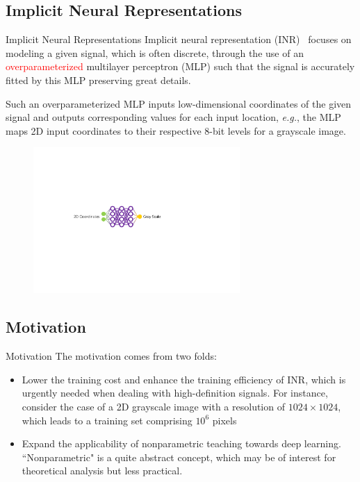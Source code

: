 \documentclass[aspectratio=169,xcolor=dvipsnames]{beamer}
\newcommand{\eg}{\textit{\fontspec{Times New Roman}e.g.}}
\begin{document}
\subsection{Implicit Neural Representations}
\begin{frame}{Implicit Neural Representations}
\justify
\vspace{-2mm}
Implicit neural representation (INR)~\cite{sitzmann2020implicit,tancik2020fourier} focuses on modeling a given signal, which is often discrete, through the use of \alert{an \textcolor{red}{overparameterized} multilayer perceptron (MLP)} such that the signal is accurately fitted by this MLP preserving great details.

\vspace{3mm}

Such an overparameterized MLP inputs \alert{low-dimensional coordinates} of the given signal and outputs corresponding values for each input location, \eg, the MLP maps 2D input coordinates to their respective 8-bit levels for a grayscale image.

\begin{figure}
  \centering
  \includegraphics[width=0.7\textwidth]{Source/INRdemo.pdf}
\end{figure}
\end{frame}

\subsection{Motivation}
\begin{frame}{Motivation}
    \justify
    The motivation comes from two folds:
    \begin{itemize}
    \item {Lower the training cost and enhance
the \alert{training efficiency} of INR, which is urgently needed when dealing with \alert{high-definition signals}. For instance, consider the case of a 2D grayscale image with a resolution of $1024\times1024$, which leads to a training set comprising $10^6$ pixels}
    \item {Expand the \alert{applicability} of \alert{nonparametric teaching} towards deep learning. ``Nonparametric" is a quite \alert{abstract} concept, which may be of interest for theoretical analysis but \alert{less practical}.}
\end{itemize}
\end{frame}
\end{document}
